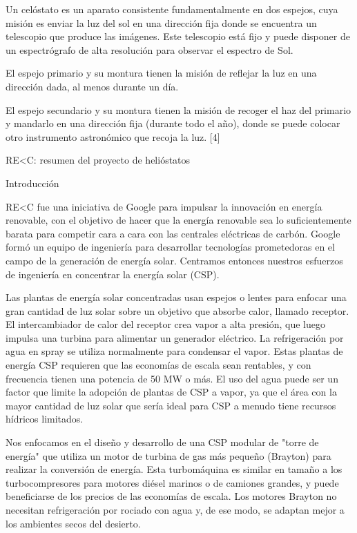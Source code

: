 \documentclass[12pt]{article}
\begin{document}
Un celóstato es un aparato consistente fundamentalmente en dos espejos, cuya misión es enviar la luz del sol en una dirección fija donde se encuentra un telescopio que produce las imágenes. Este telescopio está fijo y puede disponer de un espectrógrafo de alta resolución para observar el espectro de Sol.

El espejo primario y su montura tienen la misión de reflejar la luz en una dirección dada, al menos durante un día.

El espejo secundario y su montura tienen la misión de recoger el haz del primario y mandarlo en una dirección fija (durante todo el año), donde se puede colocar otro instrumento astronómico que recoja la luz. [4]



RE<C: resumen del proyecto de helióstatos

Introducción

RE<C fue una iniciativa de Google para impulsar la innovación en energía renovable, con el objetivo de hacer que la energía renovable sea lo suficientemente barata para competir cara a cara con las centrales eléctricas de carbón. Google formó un equipo de ingeniería para desarrollar tecnologías prometedoras en el campo de la generación de energía solar. Centramos entonces nuestros esfuerzos de ingeniería en concentrar la energía solar (CSP).

Las plantas de energía solar concentradas usan espejos o lentes para enfocar una gran cantidad de luz solar sobre un objetivo que absorbe calor, llamado receptor. El intercambiador de calor del receptor crea vapor a alta presión, que luego impulsa una turbina para alimentar un generador eléctrico. La refrigeración por agua en spray se utiliza normalmente para condensar el vapor. Estas plantas de energía CSP requieren que las economías de escala sean rentables, y con frecuencia tienen una potencia de 50 MW o más. El uso del agua puede ser un factor que limite la adopción de plantas de CSP a vapor, ya que el área con la mayor cantidad de luz solar que sería ideal para CSP a menudo tiene recursos hídricos limitados.

Nos enfocamos en el diseño y desarrollo de una CSP modular de "torre de energía" que utiliza un motor de turbina de gas más pequeño (Brayton) para realizar la conversión de energía. Esta turbomáquina es similar en tamaño a los turbocompresores para motores diésel marinos o de camiones grandes, y puede beneficiarse de los precios de las economías de escala. Los motores Brayton no necesitan refrigeración por rociado con agua y, de ese modo, se adaptan mejor a los ambientes secos del desierto.
\end{document}
